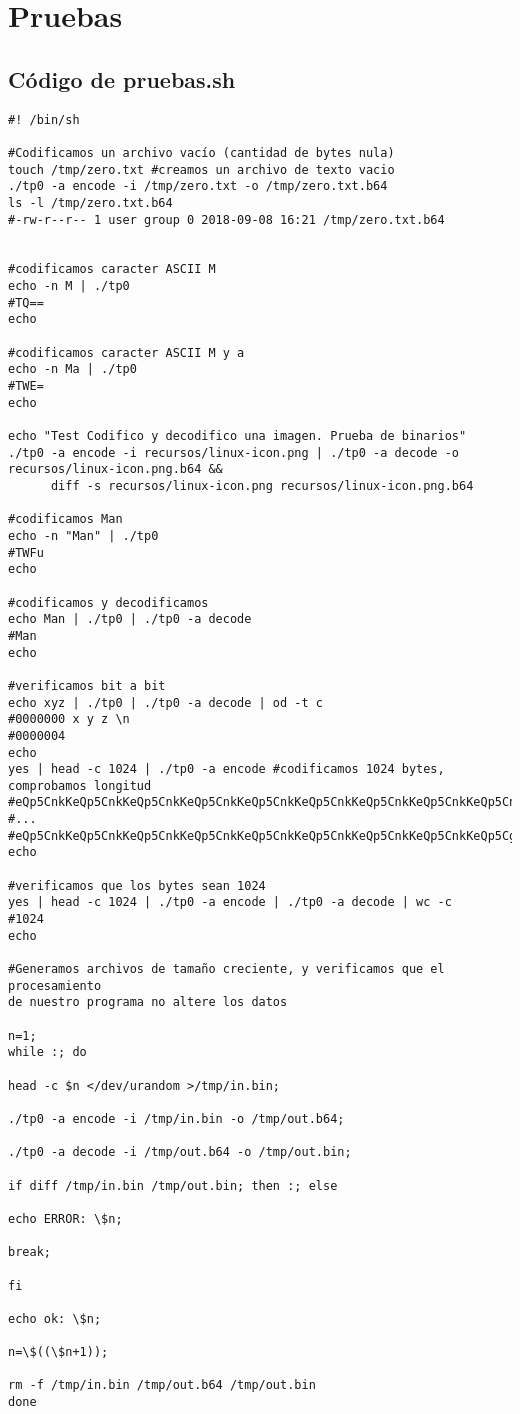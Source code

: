 \documentclass{article}
\begin{document}
\section{Pruebas}
\subsection{Código de pruebas.sh}
\begin{verbatim}
#! /bin/sh

#Codificamos un archivo vacío (cantidad de bytes nula)
touch /tmp/zero.txt #creamos un archivo de texto vacio
./tp0 -a encode -i /tmp/zero.txt -o /tmp/zero.txt.b64
ls -l /tmp/zero.txt.b64
#-rw-r--r-- 1 user group 0 2018-09-08 16:21 /tmp/zero.txt.b64


#codificamos caracter ASCII M
echo -n M | ./tp0 
#TQ==
echo

#codificamos caracter ASCII M y a
echo -n Ma | ./tp0 
#TWE=
echo

echo "Test Codifico y decodifico una imagen. Prueba de binarios"
./tp0 -a encode -i recursos/linux-icon.png | ./tp0 -a decode -o recursos/linux-icon.png.b64 &&
      diff -s recursos/linux-icon.png recursos/linux-icon.png.b64

#codificamos Man
echo -n "Man" | ./tp0 
#TWFu
echo

#codificamos y decodificamos
echo Man | ./tp0 | ./tp0 -a decode
#Man
echo

#verificamos bit a bit
echo xyz | ./tp0 | ./tp0 -a decode | od -t c
#0000000 x y z \n
#0000004
echo
yes | head -c 1024 | ./tp0 -a encode #codificamos 1024 bytes, comprobamos longitud
#eQp5CnkKeQp5CnkKeQp5CnkKeQp5CnkKeQp5CnkKeQp5CnkKeQp5CnkKeQp5CnkKeQp5CnkK
#...
#eQp5CnkKeQp5CnkKeQp5CnkKeQp5CnkKeQp5CnkKeQp5CnkKeQp5CnkKeQp5CnkKeQp5Cg==
echo

#verificamos que los bytes sean 1024
yes | head -c 1024 | ./tp0 -a encode | ./tp0 -a decode | wc -c 
#1024
echo

#Generamos archivos de tamaño creciente, y verificamos que el procesamiento
de nuestro programa no altere los datos

n=1;
while :; do

head -c $n </dev/urandom >/tmp/in.bin;

./tp0 -a encode -i /tmp/in.bin -o /tmp/out.b64;

./tp0 -a decode -i /tmp/out.b64 -o /tmp/out.bin;

if diff /tmp/in.bin /tmp/out.bin; then :; else

echo ERROR: \$n;

break;

fi

echo ok: \$n;

n=\$((\$n+1));

rm -f /tmp/in.bin /tmp/out.b64 /tmp/out.bin
done
\end{verbatim}
\end{document}
